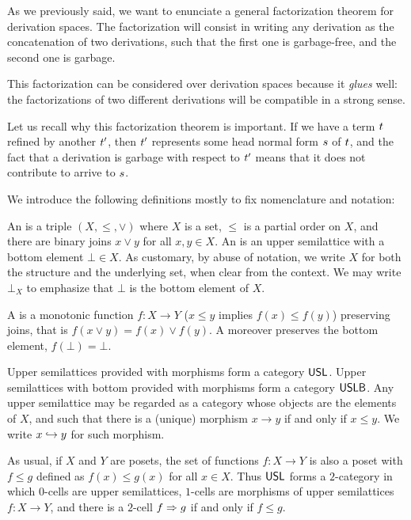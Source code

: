 
As we previously said, we want to enunciate a general
factorization theorem for derivation spaces.
The factorization will consist in writing any derivation as
the concatenation of two derivations, such that the first one is garbage-free,
and the second one is garbage.

This factorization can be considered over derivation spaces because
it \emph{glues} well: the factorizations of two different derivations will
be compatible in a strong sense.

Let us recall why this factorization theorem is important.
If we have a term $\tm$ refined by another $\tm'$, then
$\tm'$ represents some head normal form $\tmtwo$ of $\tm$,
and the fact that a derivation is garbage with respect to $\tm'$
means that it does not contribute to arrive to $\tmtwo$.


We introduce the following definitions mostly to fix nomenclature and notation:

\begin{definition}
An  is a triple $(X,\leq,\lor)$
where $X$ is a set, $\leq$ is a partial order on $X$,
and there are binary joins $x \lor y$ for all $x, y \in X$.
An  is an upper semilattice
with a bottom element $\bot \in X$.
As customary, by abuse of notation, we write $X$ for both the structure
and the underlying set, when clear from the context.
We may write $\bot_X$ to emphasize that $\bot$ is the bottom element of $X$.

A 
is a monotonic function $f : X \to Y$
(\ie $x \leq y$ implies $f(x) \leq f(y)$)
preserving joins,
that is $f(x \lor y) = f(x) \lor f(y)$.
A 
moreover preserves the bottom element, \ie $f(\bot) = \bot$.

Upper semilattices provided with morphisms form a category $\USL$.
Upper semilattices with bottom provided with morphisms form a category $\USLB$.
Any upper semilattice may be regarded as a category
whose objects are the elements of $X$, and such that there is a (unique) morphism
$x \to y$ if and only if $x \leq y$.
We write $\pt{y}{x}$ for such morphism.

As usual, if $X$ and $Y$ are posets, the set of functions $f : X \to Y$
is also a poset with $f \leq g$ defined as $f(x) \leq g(x)$ for all $x \in X$.
Thus $\USL$ forms a $2$-category
in which $0$-cells are upper semilattices,
$1$-cells are morphisms of upper semilattices $f : X \to Y$, 
and there is a $2$-cell $f \totwo g$ if and only if $f \leq g$.
\end{definition}

